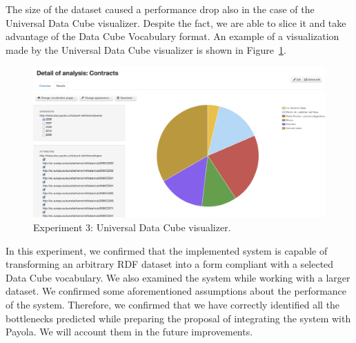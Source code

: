 The size of the dataset caused a performance drop also in the case of the
Universal Data Cube visualizer. Despite the fact, we are able to slice it and 
take advantage of the Data Cube Vocabulary format. An example of a visualization 
made by the Universal Data Cube visualizer is shown in 
Figure~\ref{fig:contracts-uni-dcv}.

\begin{figure}
  \centering
  \includegraphics[width=140mm]{img/contracts-uni-dcv.png}
  \caption{Experiment 3: Universal Data Cube visualizer.}
  \label{fig:contracts-uni-dcv}
\end{figure}

In this experiment, we confirmed that the implemented system is capable of 
transforming an arbitrary RDF dataset into a form compliant with a selected Data 
Cube vocabulary. We also examined the system while working with a larger 
dataset. We confirmed some aforementioned assumptions about the performance of 
the system. Therefore, we confirmed that we have correctly identified all the 
bottlenecks predicted while preparing the proposal of integrating the system with Payola. 
We will account them in the future improvements.

